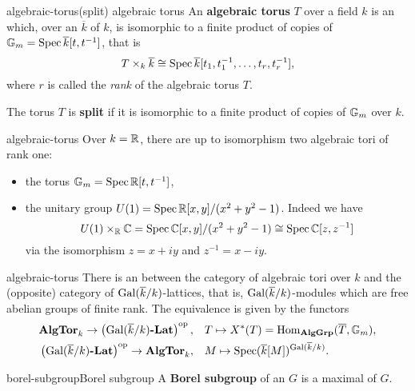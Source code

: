 \begin{topic}{algebraic-torus}{(split) algebraic torus}
    An \textbf{algebraic torus} $T$ over a field $k$ is an  which, over an  $\overline{k}$ of $k$, is isomorphic to a finite product of copies of $\mathbb{G}_m = \operatorname{Spec} \overline{k}[t, t^{-1}]$, that is
    \[ T \times_k \overline{k} \cong \operatorname{Spec} \overline{k}[t_1, t_1^{-1}, \ldots, t_r, t_r^{-1}] , \]
    where $r$ is called the \textit{rank} of the algebraic torus $T$.
    
    The torus $T$ is \textbf{split} if it is isomorphic to a finite product of copies of $\mathbb{G}_m$ over $k$.
\end{topic}

\begin{example}{algebraic-torus}
    Over $k = \mathbb{R}$, there are up to isomorphism two algebraic tori of rank one:
    \begin{itemize}
        \item the torus $\mathbb{G}_m = \operatorname{Spec} \mathbb{R}[t, t^{-1}]$,
        \item the unitary group $U(1) = \operatorname{Spec} \mathbb{R}[x, y] / (x^2 + y^2 - 1)$. Indeed we have
        \[ U(1) \times_{\mathbb{R}} \mathbb{C} = \operatorname{Spec} \mathbb{C}[x, y] / (x^2 + y^2 - 1) \cong \operatorname{Spec} \mathbb{C}[z, z^{-1}] \]
        via the isomorphism $z = x + iy$ and $z^{-1} = x - iy$.
    \end{itemize}
\end{example}

\begin{example}{algebraic-torus}
    There is an  between the category of algebraic tori over $k$ and the (opposite) category of $\textup{Gal}(\overline{k}/k)$-lattices, that is, $\textup{Gal}(\overline{k}/k)$-modules which are free abelian groups of finite rank. The equivalence is given by the functors
    \[ \begin{aligned}
        \textbf{AlgTor}_k \to \left(\textup{Gal}(\overline{k}/k)\textbf{-Lat}\right)^\textup{op}, & \quad T \mapsto X^*(T) = \operatorname{Hom}_{\textbf{AlgGrp}}(\overline{T}, \mathbb{G}_m) , \\
        \left(\textup{Gal}(\overline{k}/k)\textbf{-Lat}\right)^\textup{op} \to \textbf{AlgTor}_k, & \quad M \mapsto \operatorname{Spec}(\overline{k}[M])^{\textup{Gal}(\overline{k}/k)} .
    \end{aligned} \]
\end{example}

\begin{topic}{borel-subgroup}{Borel subgroup}
    A \textbf{Borel subgroup} of an  $G$ is a maximal    of $G$.
\end{topic}


